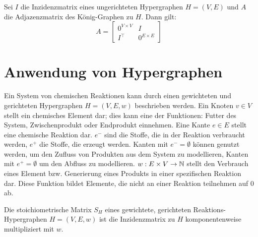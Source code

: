 \begin{proposition}
    Sei $ I $ die Inzidenzmatrix eines ungerichteten Hypergraphen $ H = (V, E) $ und $ A $ die Adjazenzmatrix des König-Graphen zu $ H $.
    Dann gilt:
    \begin{equation*}
        A = \begin{bmatrix}
            0^{V \times V} & I \\
            I^\top & 0^{E \times E}
        \end{bmatrix}
    \end{equation*}
\end{proposition}

\section{Anwendung von Hypergraphen}

Ein System von chemischen Reaktionen kann durch einen gewichteten und gerichteten Hypergraphen $ H = (V, E, w) $ beschrieben werden.
Ein Knoten $ v \in V $ stellt ein chemisches Element dar; dies kann eine der Funktionen: Futter des System, Zwischenprodukt oder Endprodukt einnehmen.
Eine Kante $ e \in E $ stellt eine chemische Reaktion dar.
$ e^- $ sind die Stoffe, die in der Reaktion verbraucht werden, $ e^+ $ die Stoffe, die erzeugt werden.
Kanten mit $ e^- = \emptyset $ können genutzt werden, um den Zufluss von Produkten aus dem System zu modellieren, Kanten mit $ e^+ = \emptyset $ um den Abfluss zu modellieren.
$ w : E \times V \to \mathbb{N} $ stellt den Verbrauch eines Element bzw. Generierung eines Produkts in einer spezifischen Reaktion dar.
Diese Funktion bildet Elemente, die nicht an einer Reaktion teilnehmen auf $ 0 $ ab.

\begin{definition}
    Die stoichiometrische Matrix $ S_H $ eines gewichtete, gerichteten Reaktions-Hypergraphen $ H = (V, E, w) $ ist die Inzidenzmatrix zu $ H $ komponentenweise multipliziert mit $ w $.
\end{definition}

